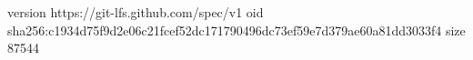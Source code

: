 version https://git-lfs.github.com/spec/v1
oid sha256:c1934d75f9d2e06c21fcef52dc171790496dc73ef59e7d379ae60a81dd3033f4
size 87544
